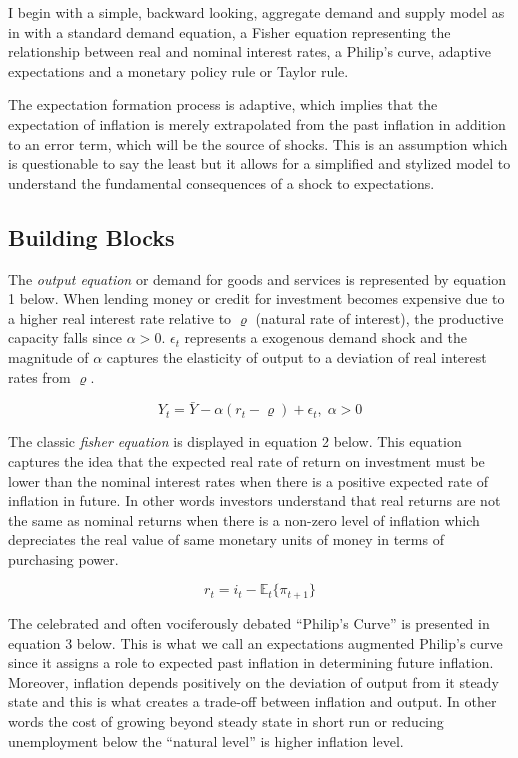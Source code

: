 \documentclass[12pt]{article}
\newcommand{\1}{\mathbbm 1}
\renewcommand{\rho}{\varrho}
\begin{document}
		 I begin with a simple, backward looking, aggregate demand and supply model as in \cite{abel2017macroeconomics} with a standard demand equation, a Fisher equation representing the relationship between real and nominal interest rates, a Philip's curve, adaptive expectations and a monetary policy rule or Taylor rule. 
		 
		 The expectation formation process is adaptive, which implies that the expectation of inflation is merely extrapolated from the past inflation in addition to an error term, which will be the source of shocks. This is an assumption which is questionable to say the least but it allows for a simplified and stylized model to understand the fundamental consequences of a shock to expectations.
		
		\subsection{Building Blocks}
		
		The \textit{output equation} or demand for goods and services is represented by equation 1 below. When lending money or credit for investment becomes expensive due to a higher real interest rate relative to $\rho$ (natural rate of interest), the productive capacity falls since $\alpha > 0$. $\epsilon_{t}$ represents a exogenous demand shock and the magnitude of $\alpha$ captures the elasticity of output to a deviation of real interest rates from $\rho$.
		
		\begin{equation}
			Y_{t} = \bar{Y} - \alpha (r_{t} - \rho) + \epsilon_{t}, \; \alpha > 0
		\end{equation}
	
	
	The classic \textit{fisher equation} is displayed in equation 2 below. This equation captures the idea that the expected real rate of return on investment must be lower than the nominal interest rates when there is a positive expected rate of inflation in future. In other words investors understand that real returns are not the same as nominal returns when there is a non-zero level of inflation which depreciates the real value of same monetary units of money in terms of purchasing power.

	
	
	 
	\begin{equation}
		r_{t} = i_{t} - \mathbb{E}_{t}\{\pi_{t+1}\}
	\end{equation}
		
		The celebrated and often vociferously debated ``Philip's Curve'' is presented in equation 3 below. This is what we call an expectations augmented Philip's curve since it assigns a role to expected past inflation in determining future inflation. Moreover, inflation depends positively on the deviation of output from it steady state and this is what creates a trade-off between inflation and output. In other words the cost of growing beyond steady state in short run or reducing unemployment below the ``natural level'' is higher inflation level.
		
\end{document}
